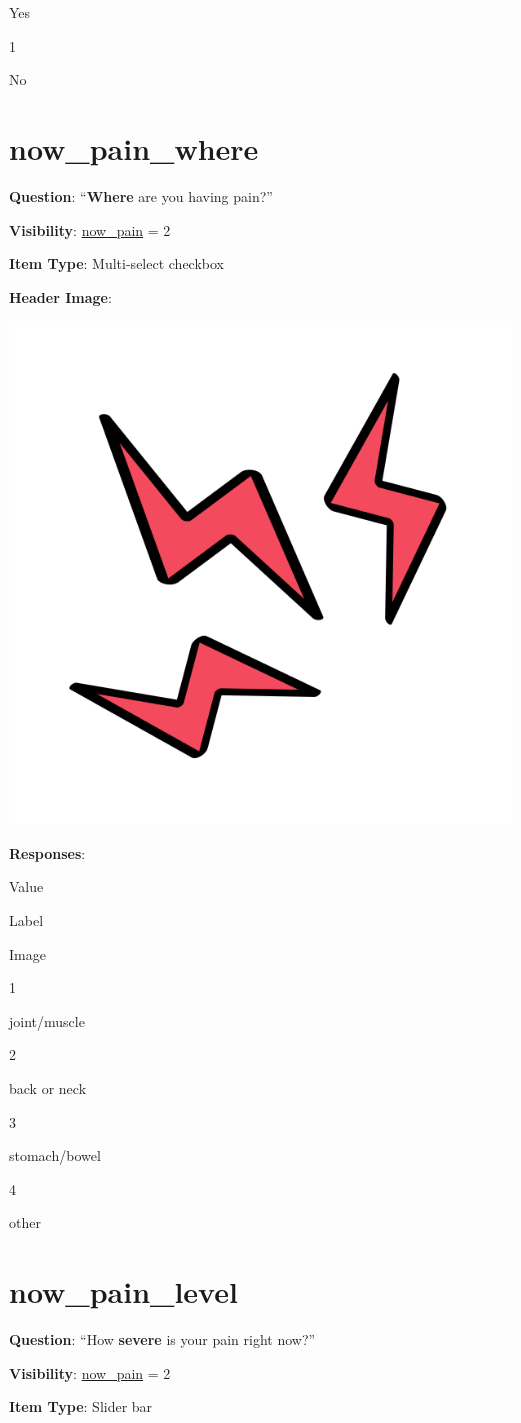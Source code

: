 \documentclass[]{book}
\begin{document}
Yes

1

No

\hypertarget{now_pain_where}{%
\section{now\_pain\_where}\label{now_pain_where}}

\textbf{Question}: ``\textbf{Where} are you having pain?''

\textbf{Visibility}: \protect\hyperlink{now_pain}{now\_pain} = 2

\textbf{Item Type}: Multi-select checkbox

\textbf{Header Image}:

\begin{flushleft}\includegraphics[width=0.33\linewidth]{downloadFigs4latex_NIMH_Applet_Codebook/now_pain_where_headerImg} \end{flushleft}

\textbf{Responses}:

Value

Label

Image

1

joint/muscle

2

back or neck

3

stomach/bowel

4

other

\hypertarget{now_pain_level}{%
\section{now\_pain\_level}\label{now_pain_level}}

\textbf{Question}: ``How \textbf{severe} is your pain right now?''

\textbf{Visibility}: \protect\hyperlink{now_pain}{now\_pain} = 2

\textbf{Item Type}: Slider bar
\end{document}
